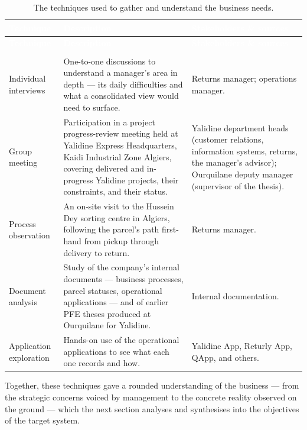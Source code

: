 \begingroup
\renewcommand{\arraystretch}{1.35}
\begin{xltabular}{\linewidth}{|>{\raggedright\arraybackslash}p{2.9cm}|>{\raggedright\arraybackslash}X|>{\raggedright\arraybackslash}p{3.1cm}|}
\caption{The techniques used to gather and understand the business needs.}
\label{tab:ch3-methods} \\
\hline
{}
\textcolor{white}{\textbf{Technique}} & \textcolor{white}{\textbf{Description}} &
\textcolor{white}{\textbf{Stakeholders \& sources}} \\
\hline
\endfirsthead
\hline
{}
\textcolor{white}{\textbf{Technique}} & \textcolor{white}{\textbf{Description}} &
\textcolor{white}{\textbf{Stakeholders \& sources}} \\
\hline
\endhead
\hline
{} \\
\endfoot
\endlastfoot
Individual interviews & One-to-one discussions to understand a manager's area in depth --- its daily
difficulties and what a consolidated view would need to surface. & Returns manager; operations
manager. \\
Group meeting & Participation in a project progress-review meeting held at Yalidine Express Headquarters, Kaidi Industrial Zone Algiers, covering
delivered and in-progress Yalidine projects, their constraints, and their status. & Yalidine department
heads (customer relations, information systems, returns, the manager's advisor); Ourquilane
deputy manager (supervisor of the thesis). \\
Process observation & An on-site visit to the Hussein Dey sorting centre in Algiers, following the
parcel's path first-hand from pickup through delivery to return. & Returns manager. \\
Document analysis & Study of the company's internal documents --- business processes, parcel statuses,
operational applications --- and of earlier PFE theses produced at Ourquilane for Yalidine. & Internal
documentation. \\
Application exploration & Hands-on use of the operational applications to see what each one records and
how. & Yalidine App, Returly App, QApp, and others. \\
\hline
\end{xltabular}
\endgroup

Together, these techniques gave a rounded understanding of the business --- from the strategic concerns
voiced by management to the concrete reality observed on the ground --- which the next section analyses
and synthesises into the objectives of the target system.


